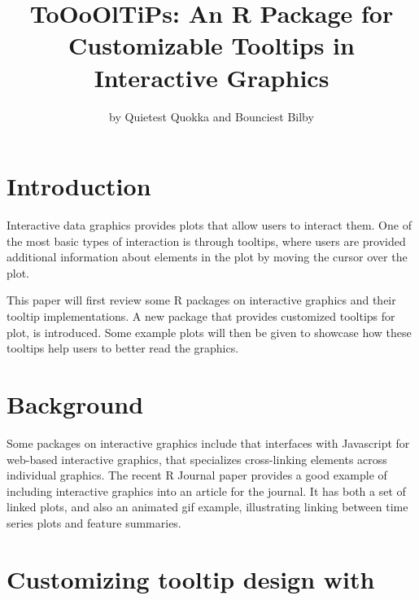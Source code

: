 \title{ToOoOlTiPs: An R Package for Customizable Tooltips in Interactive Graphics}


\author{by Quietest Quokka and Bounciest Bilby}

\maketitle


\section{Introduction}\label{introduction}

Interactive data graphics provides plots that allow users to interact them. One of the most basic types of interaction is through tooltips, where users are provided additional information about elements in the plot by moving the cursor over the plot.

This paper will first review some R packages on interactive graphics and their tooltip implementations. A new package  that provides customized tooltips for plot, is introduced. Some example plots will then be given to showcase how these tooltips help users to better read the graphics.

\section{Background}\label{background}

Some packages on interactive graphics include  \citep{plotly} that interfaces with Javascript for web-based interactive graphics,  \citep{crosstalk} that specializes cross-linking elements across individual graphics. The recent R Journal paper  \citep{RJ-2021-050} provides a good example of including interactive graphics into an article for the journal. It has both a set of linked plots, and also an animated gif example, illustrating linking between time series plots and feature summaries.

\section{\texorpdfstring{Customizing tooltip design with }{Customizing tooltip design with }}\label{customizing-tooltip-design-with}

